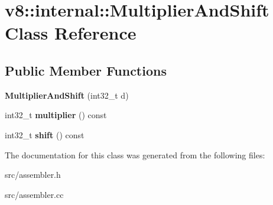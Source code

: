 \hypertarget{classv8_1_1internal_1_1_multiplier_and_shift}{}\section{v8\+:\+:internal\+:\+:Multiplier\+And\+Shift Class Reference}
\label{classv8_1_1internal_1_1_multiplier_and_shift}
\subsection*{Public Member Functions}
\begin{DoxyCompactItemize}
\item 
\hypertarget{classv8_1_1internal_1_1_multiplier_and_shift_aa706525702b100b07a5dd7000002cc5f}{}{\bfseries Multiplier\+And\+Shift} (int32\+\_\+t d)\label{classv8_1_1internal_1_1_multiplier_and_shift_aa706525702b100b07a5dd7000002cc5f}

\item 
\hypertarget{classv8_1_1internal_1_1_multiplier_and_shift_ac77a86a1353aa6e90b1dc4a349189c7f}{}int32\+\_\+t {\bfseries multiplier} () const \label{classv8_1_1internal_1_1_multiplier_and_shift_ac77a86a1353aa6e90b1dc4a349189c7f}

\item 
\hypertarget{classv8_1_1internal_1_1_multiplier_and_shift_a35dccceec649e2f26a642c88ac123602}{}int32\+\_\+t {\bfseries shift} () const \label{classv8_1_1internal_1_1_multiplier_and_shift_a35dccceec649e2f26a642c88ac123602}

\end{DoxyCompactItemize}


The documentation for this class was generated from the following files\+:\begin{DoxyCompactItemize}
\item 
src/assembler.\+h\item 
src/assembler.\+cc\end{DoxyCompactItemize}
